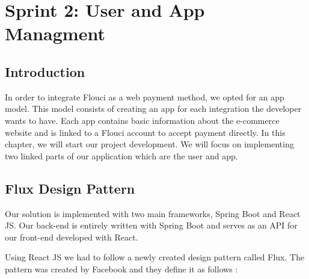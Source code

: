 
\setcounter{chapter}{3}
\chapter{Sprint 2: User and App Managment}
\minitoc %
\graphicspath{{Chapter4/figures/}}

\pagestyle{fancy}
\fancyhf{}
\fancyhead[R]{\bfseries\rightmark}
\fancyfoot[R]{\thepage}
\renewcommand{\headrulewidth}{0.5pt}
\renewcommand{\footrulewidth}{0pt}
\renewcommand{\chaptermark}[1]{\markboth{\MakeUppercase{\chaptername~\thechapter. #1 }}{}}
\renewcommand{\sectionmark}[1]{\markright{\thechapter.\thesection~ #1}}

\begin{spacing}{1.2}

\section*{Introduction}
In order to integrate Flouci as a web payment method, we opted for an app model. This model consists of creating an app for each integration the developer wants to have. Each app contains basic information about the e-commerce website and is linked to a Flouci account to accept payment directly.
\newline
In this chapter, we will start our project development. We will focus on implementing two linked parts of our application which are the user and app. 

\section{Flux Design Pattern}
Our solution is implemented with two main frameworks, Spring Boot and React JS.
Our back-end is entirely written with Spring Boot and serves as an API for our front-end developed with React.
\newline

Using React JS we had to follow a newly created design pattern called Flux. The pattern was created by Facebook and they define it as follows : 
\newline



\end{spacing}

